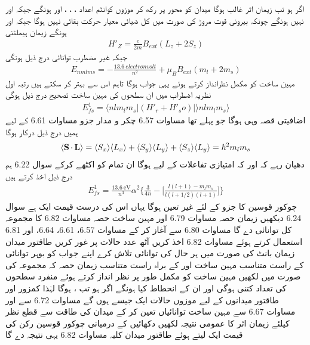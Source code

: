 اگر  ہو تب زیمان  اثر غالب ہوگا میدان  کو  محور پر رکھ کر موزوں کوانٹم اعداد ، ، ، اور  ہونگے جبکہ  اور  نہیں ہونگے چونکہ بیرونی قوت مروڑ کی صورت میں کل ضیائی معیار حرکت بقائی  نہیں ہوگا جبکہ  اور  ہونگے زیمان ہیملٹنی 
\begin{align*}
H'_Z = \frac{e}{2m} B_{ext} (L_z + 2S_z)
\end{align*}
جبکہ غیر مضطرب توانائی درج ذیل ہونگی 
\begin{align}
E_{nmlms} = - \frac{\SI{13.6}{electronvolt}}{n^2} + \mu_B B_{ext} (m_l + 2m_s)
\end{align}
مہین ساخت کو مکمل نظرانداز کرتے ہوئے یہی جواب ہوگا تاہم اس سے بہتر کر سکتے ہیں رتبہ اول نظریہ اضطراب میں ان سطحوں کی مہین ساخت تصحیح درج ذیل ہوگی 
\begin{align}
E_{fs}^1 = \langle nlm_l m_s | (H'_r + H'_so) | \rangle nlm_l m_s \rangle
\end{align}
اضافیتی قصہ وہی ہوگا جو پہلے تھا مساوات 6.57 چکر و مدار جزو مساوات 6.61 کے لیے ہمیں درج ذیل درکار ہوگا 
\begin{align}
\langle \operatorname{\mathbf{S}} \cdot \operatorname{\mathbf{L}} \rangle = \langle S_x \rangle \langle L_x \rangle + \langle S_y \rangle \langle L_y \rangle + \langle S_z \rangle \langle L_y \rangle = \hslash^2 m_l m_s
\end{align}
دھیان رہے کہ  اور  کہ امتیازی تفاعلات کے لیے  ہوگا ان تمام کو اکٹھے کرکے سوال 6.22 ہم درج ذیل اخذ کرتے ہیں 
\begin{align}
E_{fs}^1 = \frac{\SI{13.6}{\electronvolt}}{n^3} \alpha^2 \big \{ \frac{3}{4n} - \big [ \frac{l(l + 1) - m_l m_s}{l(l + 1/2)(l + 1)} \big ] \}
\end{align}
 چوکور  قوسین   کا جزو  کے لئے غیر تعین ہوگا یہاں اس کی درست قیمت ایک ہے سوال 6.24 دیکھیں زیمان حصہ مساوات 6.79 اور مہین ساخت حصہ مساوات 6.82 کا مجموعہ کل توانائی دے گا 
مساوات 6.80 سے آغاز کر کے مساوات 6.57، 6.61، 6.64، اور 6.81 استعمال کرتے ہوئے مساوات 6.82 اخذ کریں 
آٹھ عدد  حالات   پر غور کریں طاقتور میدان زیمان بانٹ کی صورت میں ہر حال کی توانائی تلاش کرے اپنے جواب کو بوہر توانائی   کے راست متناسب مہین ساخت اور   کے براہ راست متناسب زیمان حصہ کہ مجموعہ کی صورت میں لکھیں مہین  ساخت کو مکمل طور پر نظر انداز کرتے ہوئے منفرد سطحوں کی تعداد کتنی ہوگی اور ان کے انحطاط کیا ہونگے 
اگر  ہو تب ،  ہوگا لہٰذا کمزور اور طاقتور میدانوں کے لیے موزوں حالات  ایک  جیسے ہوں گے مساوات 6.72 سے  اور مساوات 6.67 سے مہین ساخت توانائیاں تعین کر کے میدان کی طاقت سے قطع نظر  کیلئے زیمان اثر کا عمومی نتیجہ لکھیں دکھائیں کے درمیانی چوکور قوسین   رکن کی قیمت ایک لیتے ہوئے طاقتور میدان کلیہ مساوات 6.82 یہی نتیجہ دے گا 

